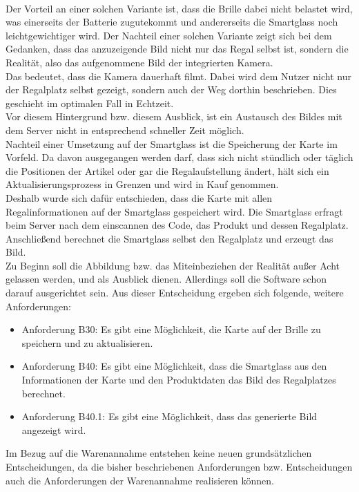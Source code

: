 \\
Der Vorteil an einer solchen Variante ist, dass die Brille dabei nicht belastet wird, was einerseits der Batterie zugutekommt und andererseits die Smartglass noch leichtgewichtiger wird. 
Der Nachteil einer solchen Variante zeigt sich bei dem Gedanken, dass das anzuzeigende Bild nicht nur das Regal selbst ist, sondern die Realität, also das aufgenommene Bild der integrierten Kamera. 
\\
Das bedeutet, dass die Kamera dauerhaft filmt. Dabei wird dem Nutzer nicht nur der Regalplatz selbst gezeigt, sondern auch der Weg dorthin beschrieben. Dies geschieht im optimalen Fall in Echtzeit.  
\\
Vor diesem Hintergrund bzw. diesem Ausblick, ist ein Austausch des Bildes mit dem Server nicht in entsprechend schneller Zeit möglich.
\\
Nachteil einer Umsetzung auf der Smartglass ist die Speicherung der Karte im Vorfeld. Da davon ausgegangen werden darf, dass sich nicht stündlich oder täglich die Positionen der Artikel oder gar die Regalaufstellung ändert, hält sich ein Aktualisierungsprozess in Grenzen und wird in Kauf genommen.
\\
Deshalb wurde sich dafür entschieden, dass die Karte mit allen Regalinformationen auf der Smartglass gespeichert wird. Die Smartglass erfragt beim Server nach dem einscannen des Code, das Produkt und dessen Regalplatz. Anschließend berechnet die Smartglass selbst den Regalplatz und erzeugt das Bild. 
\\
Zu Beginn soll die Abbildung bzw. das Miteinbeziehen der Realität außer Acht gelassen werden, und als Ausblick dienen. Allerdings soll die Software schon darauf ausgerichtet sein.
Aus dieser Entscheidung ergeben sich folgende, weitere Anforderungen: 
\begin{itemize}
	\item Anforderung B30: Es gibt eine Möglichkeit, die Karte auf der Brille zu speichern und zu aktualisieren. 
	\item Anforderung B40: Es gibt eine Möglichkeit, dass die Smartglass aus den Informationen der Karte und den Produktdaten das Bild des Regalplatzes berechnet.
	\item Anforderung B40.1: Es gibt eine Möglichkeit, dass das generierte Bild angezeigt wird.
\end{itemize}
Im Bezug auf die Warenannahme entstehen keine neuen grundsätzlichen Entscheidungen, da die bisher beschriebenen Anforderungen bzw. Entscheidungen auch die Anforderungen der Warenannahme realisieren können. 
